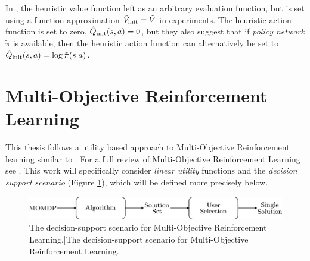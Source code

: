         In \cite{ments}, the heuristic value function left as an arbitrary evaluation function, but is set using a function approximation ${\hat{V}_{\textnormal{init}}}=\tilde{V}$ in experiments. The heuristic action function is set to zero, ${\hat{Q}_{\textnormal{init}}}(s,a)=0$, but they also suggest that if \textit{policy network} $\tilde{\pi}$ is available, then the heuristic action function can alternatively be set to ${\hat{Q}_{\textnormal{init}}}(s,a)=\log \tilde{\pi}(s|a)$. 















\section{Multi-Objective Reinforcement Learning}
\label{sec:2-5-morl}





    This thesis follows a utility based approach to Multi-Objective Reinforcement learning similar to . For a full review of Multi-Objective Reinforcement Learning see . This work will specifically consider \textit{linear utility} functions and the \textit{decision support scenario} (Figure \ref{fig:mo_decision_support}), which will be defined more precisely below. 

    \begin{figure}
        \centering\includegraphics[width=1.0\textwidth]{figures/ch2/decision_support_scenario.pdf} 
        \caption{The decision-support scenario for Multi-Objective Reinforcement Learning.]{The decision-support scenario for Multi-Objective Reinforcement Learning. }}
        \label{fig:mo_decision_support}
    \end{figure}

